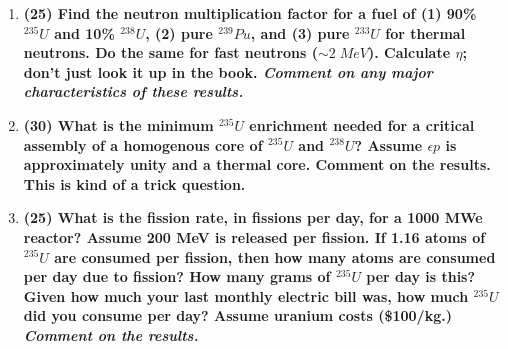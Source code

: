 \documentclass[11pt,a4paper]{article}
\begin{document}
\begin{enumerate}[leftmargin=*,topsep=0pt,font=\bfseries]
    \item\textbf{(25) Find the neutron multiplication factor for a fuel of (1) 90\% $^{235}U$ and 10\% $^{238}U$, (2) pure $^{239}Pu$, and (3) pure $^{233}U$ for thermal neutrons. Do the same for fast neutrons ($\sim 2 \; MeV$). Calculate $\eta$; don't just look it up in the book. \textit{Comment on any major characteristics of these results.}}
        \vspace{0.25in}\\

        
        
        
        
        
        
        
        
        
        
        
        
        
        
        \newpage 
    \item\textbf{(30) What is the minimum $^{235}U$ enrichment needed for a critical assembly of a homogenous core of $^{235}U$ and $^{238}U$? Assume $\epsilon p$ is approximately unity and a thermal core. Comment on the results. This is kind of a trick question.}
        \vspace{0.25in}\\
















        \newpage 
    \item\textbf{(25) What is the fission rate, in fissions per day, for a 1000 MWe reactor? Assume 200 MeV is released per fission. If 1.16 atoms of $^{235}U$ are consumed per fission, then how many atoms are consumed per day due to fission? How many grams of $^{235}U$ per day is this? Given how much your last monthly electric bill was, how much $^{235}U$ did you consume per day?  Assume uranium costs (\$100/kg.) \textit{Comment on the results.}}
        \vspace{0.25in}\\
















\end{enumerate}
\end{document}
